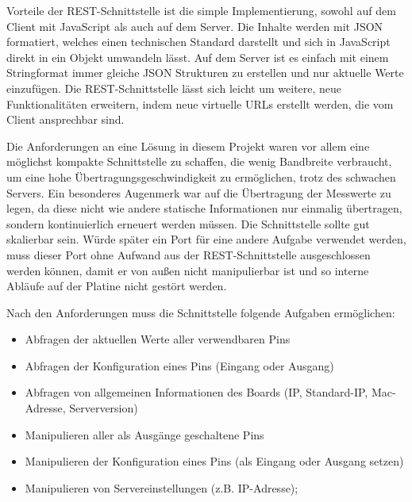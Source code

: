 Vorteile der REST-Schnittstelle ist die simple Implementierung, sowohl auf dem Client mit
JavaScript als auch auf dem Server. Die Inhalte werden mit JSON formatiert, welches einen
technischen Standard darstellt und sich in JavaScript direkt in ein Objekt umwandeln
lässt. Auf dem Server ist es einfach mit einem Stringformat immer gleiche JSON Strukturen
zu erstellen und nur aktuelle Werte einzufügen. Die REST-Schnittstelle lässt sich leicht
um weitere, neue Funktionalitäten erweitern, indem neue virtuelle URLs erstellt werden, die
vom Client ansprechbar sind.

Die Anforderungen an eine Lösung in diesem Projekt waren vor allem eine
möglichst kompakte Schnittstelle zu schaffen, die wenig Bandbreite verbraucht, um eine hohe
Übertragungsgeschwindigkeit zu ermöglichen, trotz des schwachen Servers. Ein besonderes
Augenmerk war auf die Übertragung der Messwerte zu legen, da diese nicht wie andere
statische Informationen nur einmalig übertragen, sondern kontinuierlich erneuert
werden müssen. Die Schnittstelle sollte gut skalierbar sein. Würde später ein Port für
eine andere Aufgabe verwendet werden, muss dieser Port ohne Aufwand aus der
REST-Schnittstelle ausgeschlossen werden können, damit er von außen nicht manipulierbar
ist und so interne Abläufe auf der Platine nicht gestört werden.

Nach den Anforderungen muss die Schnittstelle folgende Aufgaben ermöglichen:
\begin{itemize}
  \item Abfragen der aktuellen Werte aller verwendbaren Pins
  \item Abfragen der Konfiguration eines Pins (Eingang oder Ausgang)
  \item Abfragen von allgemeinen Informationen des Boards (IP, Standard-IP,
  Mac-Adresse, Serverversion)
  \item Manipulieren aller als Ausgänge geschaltene Pins
  \item Manipulieren der Konfiguration eines Pins (als Eingang oder Ausgang setzen)
  \item Manipulieren von Servereinstellungen (z.B. IP-Adresse);
\end{itemize}

